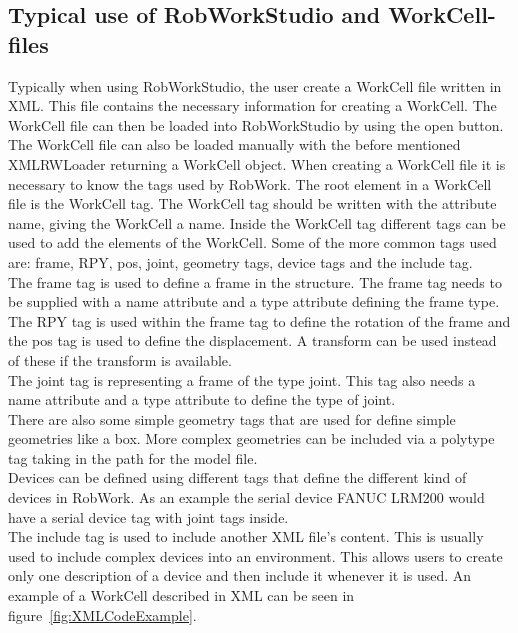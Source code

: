 \subsection{Typical use of RobWorkStudio and WorkCell-files}
Typically when using RobWorkStudio, the user create a WorkCell file written in XML. This file contains the necessary information for creating a WorkCell. The WorkCell file can then be loaded into RobWorkStudio by using the open button. The WorkCell file can also be loaded manually with the before mentioned XMLRWLoader returning a WorkCell object. When creating a WorkCell file it is necessary to know the tags used by RobWork. The root element in a WorkCell file is the WorkCell tag. The WorkCell tag should be written with the attribute name, giving the WorkCell a name. Inside the WorkCell tag different tags can be used to add the elements of the WorkCell. Some of the more common tags used are: frame, RPY, pos, joint, geometry tags, device tags and the include tag.\\
The frame tag is used to define a frame in the structure. The frame tag needs to be supplied with a name attribute and a type attribute defining the frame type.\\
The RPY tag is used within the frame tag to define the rotation of the frame and the pos tag is used to define the displacement. A transform can be used instead of these if the transform is available.\\
The joint tag is representing a frame of the type joint. This tag also needs a name attribute and a type attribute to define the type of joint.\\
There are also some simple geometry tags that are used for define simple geometries like a box. More complex geometries can be included via a polytype tag taking in the path for the model file.\\
Devices can be defined using different tags that define the different kind of devices in RobWork. As an example the serial device FANUC LRM200 would have a serial device tag with joint tags inside.\\
The include tag is used to include another XML file's content. This is usually used to include complex devices into an environment. This allows users to create only one description of a device and then include it whenever it is used. An example of a WorkCell described in XML can be seen in figure~\ref{fig:XMLCodeExample}.

